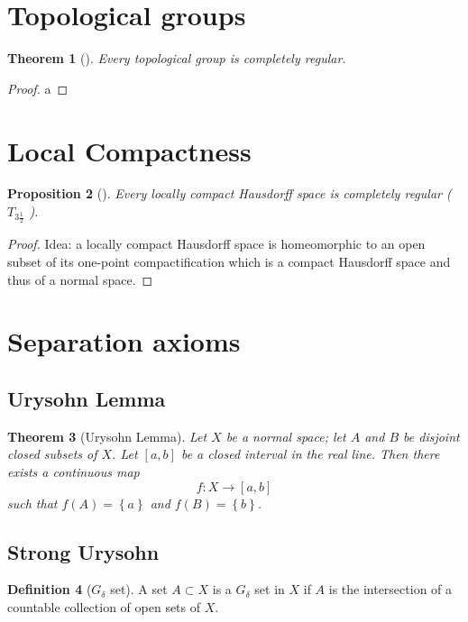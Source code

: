 \documentclass[reqno]{amsart}
\theoremstyle{plain}%
\newtheorem{theorem}{Theorem}[section]
\newtheorem{proposition}[theorem]{Proposition}
\theoremstyle{definition}
\newtheorem{definition}[theorem]{Definition}
\theoremstyle{remark}
\begin{document}
\section{Topological groups}

\begin{theorem}[]
    Every topological group is completely regular.
\end{theorem}

\begin{proof}
    a
\end{proof}

\section{Local Compactness}


\begin{proposition}[]
    Every locally compact Hausdorff space is completely regular ($T_{3
    \frac{1}{2}}$ ).
\end{proposition}

\begin{proof}
    Idea: a locally compact Hausdorff space is homeomorphic to an
    open subset of its one-point compactification which is
    a compact Hausdorff space and thus of a normal space.
\end{proof}


\section{Separation axioms}
\subsection{Urysohn Lemma}

\begin{theorem}[Urysohn Lemma]
    Let $X$ be a normal space; let $A$ and $B$ be disjoint closed subsets of
    $X$. Let $\left[ a,b \right] $ be a closed interval in the real line. Then
    there exists a continuous map
     \[
    f  \colon X \to \left[ a,b \right] 
    \] 
    such that $f(A) = \left\{ a \right\} $ and
    $f\left( B \right) = \left\{ b \right\} $.
\end{theorem}


\subsection{Strong Urysohn}

\begin{definition}[$G_{\delta} $ set]
    A set $A \subset X$ is a $G_{\delta}$ set in $X$ if 
    $A$ is the intersection of a countable collection of
    open sets of $X$.
\end{definition}
\end{document}
